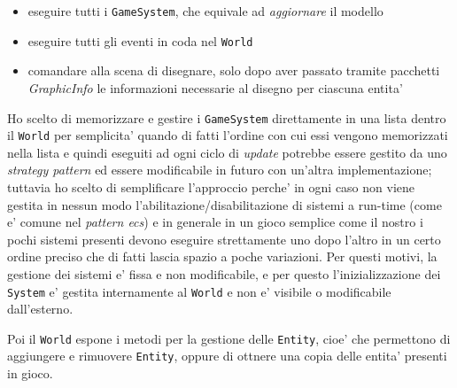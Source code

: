 \documentclass[a4paper,12pt]{report}
\begin{document}
\begin{itemize}
	\item eseguire tutti i \texttt{GameSystem}, che equivale ad \textit{aggiornare} il modello
	\item eseguire tutti gli eventi in coda nel \texttt{World}
	\item comandare alla scena di disegnare, solo dopo aver passato tramite pacchetti \textit{GraphicInfo} le informazioni necessarie al disegno per ciascuna entita'
\end{itemize}

Ho scelto di memorizzare e gestire i \texttt{GameSystem} direttamente in una lista dentro il \texttt{World} per semplicita' quando di fatti l'ordine con cui essi vengono memorizzati nella lista e quindi eseguiti ad ogni ciclo di \textit{update} potrebbe essere gestito da uno \textit{strategy pattern} ed essere modificabile in futuro con un'altra implementazione; tuttavia ho scelto di semplificare l'approccio perche' in ogni caso non viene gestita in nessun modo l'abilitazione/disabilitazione di sistemi a run-time (come e' comune nel \textit{pattern ecs}) e in generale in un gioco semplice come il nostro i pochi sistemi presenti devono eseguire strettamente uno dopo l'altro in un certo ordine preciso che di fatti lascia spazio a poche variazioni. Per questi motivi, la gestione dei sistemi e' fissa e non modificabile, e per questo l'inizializzazione dei \texttt{System} e' gestita internamente al \texttt{World} e non e' visibile o modificabile dall'esterno.

Poi il \texttt{World} espone i metodi per la gestione delle \texttt{Entity}, cioe' che permettono di aggiungere e rimuovere \texttt{Entity}, oppure di ottnere una copia delle entita' presenti in gioco.
\end{document}
